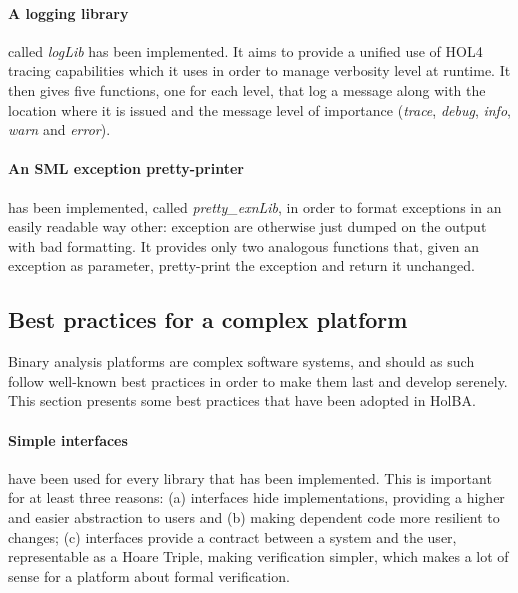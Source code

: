 \documentclass[10pt,a4paper]{article}
\begin{document}
\begin{multicols}{2}
\vspace{-8pt}
\paragraph{A logging library} called \textit{logLib} has been implemented. It aims to provide a unified use of HOL4 tracing capabilities which it uses in order to manage verbosity level at runtime. It then gives five functions, one for each level, that log a message along with the location where it is issued and the message level of importance (\textit{trace}, \textit{debug}, \textit{info}, \textit{warn} and \textit{error}).

\vspace{-8pt}
\paragraph{An SML exception pretty-printer} has been implemented, called \textit{pretty\_exnLib}, in order to format exceptions in an easily readable way other: exception are otherwise just dumped on the output with bad formatting. It provides only two analogous functions that, given an exception as parameter, pretty-print the exception and return it unchanged.

\subsection{Best practices for a complex platform} \label{best-practices-complex-platform}

Binary analysis platforms are complex software systems, and should as such follow well-known best practices in order to make them last and develop serenely. This section presents some best practices that have been adopted in HolBA.

\vspace{-8pt}
\paragraph{Simple interfaces} have been used for every library that has been implemented. This is important for at least three reasons: (a) interfaces hide implementations, providing a higher and easier abstraction to users and (b) making dependent code more resilient to changes; (c) interfaces provide a contract between a system and the user, representable as a Hoare Triple, making verification simpler, which makes a lot of sense for a platform about formal verification.


\end{multicols}
\end{document}
